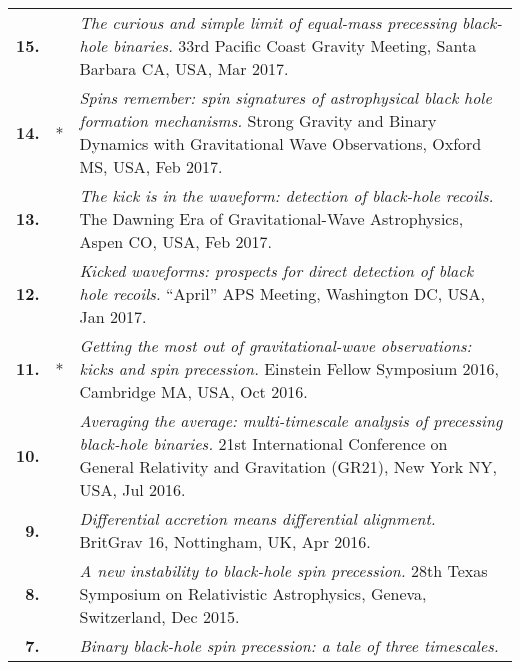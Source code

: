 {\begin{longtable}{rp{0.3cm}p{15.8cm}}
%
\textbf{15.} &  & \textit{The curious and simple limit of equal-mass precessing black-hole binaries.}
\newline{}
33rd Pacific Coast Gravity Meeting, Santa Barbara CA, USA, Mar 2017.
\vspace{0.05cm}\\
%
\textbf{14.} & * & \textit{Spins remember: spin signatures of astrophysical black hole formation mechanisms.}
\newline{}
Strong Gravity and Binary Dynamics with Gravitational Wave Observations, Oxford MS, USA, Feb 2017.
\vspace{0.05cm}\\
%
\textbf{13.} &  & \textit{The kick is in the waveform: detection of black-hole recoils.}
\newline{}
The Dawning Era of Gravitational-Wave Astrophysics, Aspen CO, USA, Feb 2017.
\vspace{0.05cm}\\
%
\textbf{12.} &  & \textit{Kicked waveforms: prospects for direct detection of black hole recoils.}
\newline{}
``April'' APS Meeting, Washington DC, USA, Jan 2017.
\vspace{0.05cm}\\
%
\textbf{11.} & * & \textit{Getting the most out of gravitational-wave observations: kicks and spin precession.}
\newline{}
Einstein Fellow Symposium 2016, Cambridge MA, USA, Oct 2016.
\vspace{0.05cm}\\
%
\textbf{10.} &  & \textit{Averaging the average: multi-timescale analysis of precessing black-hole binaries.}
\newline{}
21st International Conference on General Relativity and Gravitation (GR21), New York NY, USA, Jul 2016.
\vspace{0.05cm}\\
%
\textbf{9.} &  & \textit{Differential accretion means differential alignment.}
\newline{}
BritGrav 16, Nottingham, UK, Apr 2016.
\vspace{0.05cm}\\
%
\textbf{8.} &  & \textit{A new instability to black-hole spin precession.}
\newline{}
28th Texas Symposium on Relativistic Astrophysics, Geneva, Switzerland, Dec 2015.
\vspace{0.05cm}\\
%
\textbf{7.} &  & \textit{Binary black-hole spin precession: a tale of three timescales.}

\end{longtable}}
